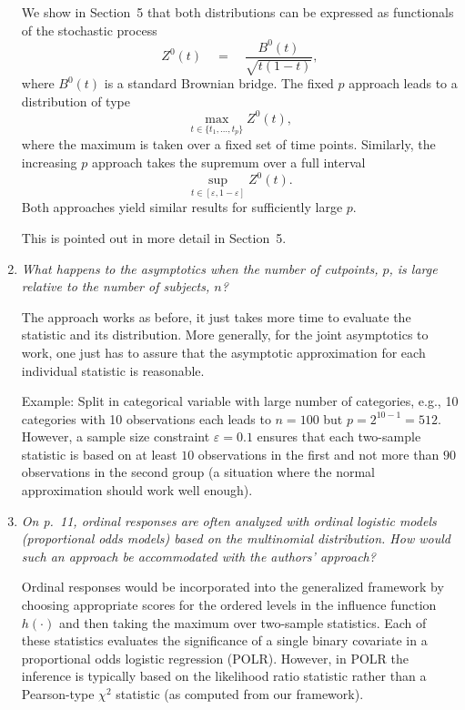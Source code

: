 \documentclass[11pt,a4paper]{article}
\begin{document}
\begin{enumerate}
	We show in Section~5 that both distributions can be expressed as functionals
	of the stochastic process	
	  \[ Z^0(t) \quad = \quad \frac{B^0(t)}{\sqrt{t (1 - t)}}, \]
	where $B^0(t)$ is a standard Brownian bridge. The fixed $p$ approach leads to
	a distribution of type
	  \[ \max_{t \in \{t_1, \dots, t_p\}} Z^0(t), \]
	where the maximum is taken over a fixed set of time points. Similarly, the increasing $p$
	approach takes the supremum over a full interval
	  \[ \sup_{t \in [\varepsilon, 1 - \varepsilon]} Z^0(t). \]
        Both approaches yield similar results for sufficiently large $p$.

	This is pointed out in more detail in Section~5.
		
  \item \textit{What happens to the asymptotics when the number of cutpoints, $p$,
        is large relative to the number of subjects, $n$?}
	
	The approach works as before, it just takes more time to evaluate the statistic
	and its distribution. More generally, for the joint asymptotics to work, one
	just has to assure that the asymptotic approximation for each individual statistic
	is reasonable.

	Example: Split in categorical variable with large number of categories, e.g.,
	10 categories with 10 observations each leads to $n = 100$ but
	$p = 2^{10 - 1} = 512$. However, a sample size constraint $\varepsilon = 0.1$
        ensures that each two-sample statistic is based on at least
        $10$ observations in the first and not more than $90$ observations
        in the second group (a situation where the normal approximation
        should work well enough).
	
  \item \textit{On p.~11, ordinal responses are often analyzed with ordinal
        logistic models (proportional odds models) based on the multinomial
	distribution. How would such an approach be accommodated with the
	authors' approach?}
	
	Ordinal responses would be incorporated into the generalized framework
	by choosing appropriate scores for the ordered levels in the influence
	function $h(\cdot)$ and then taking the maximum over two-sample statistics.
	Each of these statistics evaluates the significance of a single binary
	covariate in a proportional odds logistic regression (POLR). However, in
	POLR the inference is typically based on the likelihood ratio statistic
	rather than a Pearson-type $\chi^2$ statistic (as computed from our
	framework).
	

\end{enumerate}
\end{document}

